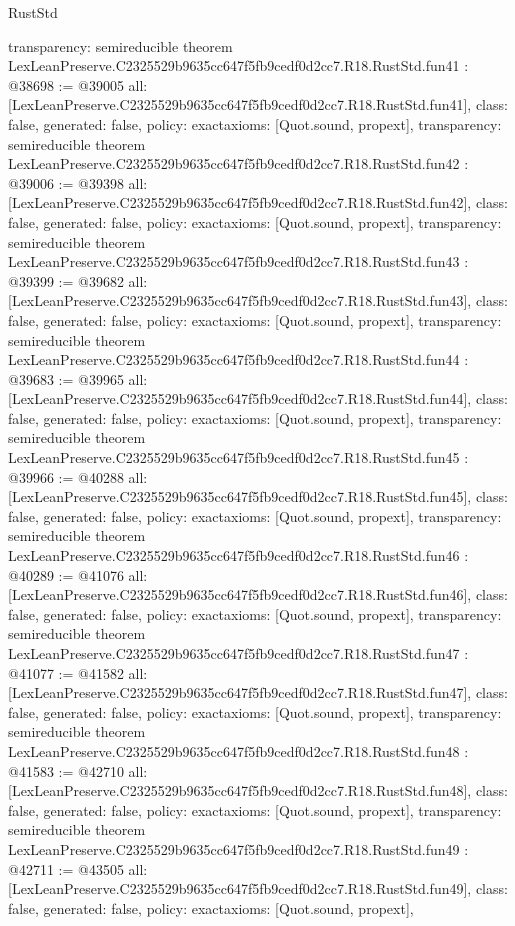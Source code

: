 \begin{lexlean}{RustStd}
\begin{coremodule}
{  transparency: semireducible
}
theorem LexLeanPreserve.C2325529b9635cc647f5fb9cedf0d2cc7.R18.RustStd.fun41 : @38698 := @39005 {
  all: [LexLeanPreserve.C2325529b9635cc647f5fb9cedf0d2cc7.R18.RustStd.fun41],
  class: false,
  generated: false,
  policy: exact{axioms: [Quot.sound, propext]},
  transparency: semireducible
}
theorem LexLeanPreserve.C2325529b9635cc647f5fb9cedf0d2cc7.R18.RustStd.fun42 : @39006 := @39398 {
  all: [LexLeanPreserve.C2325529b9635cc647f5fb9cedf0d2cc7.R18.RustStd.fun42],
  class: false,
  generated: false,
  policy: exact{axioms: [Quot.sound, propext]},
  transparency: semireducible
}
theorem LexLeanPreserve.C2325529b9635cc647f5fb9cedf0d2cc7.R18.RustStd.fun43 : @39399 := @39682 {
  all: [LexLeanPreserve.C2325529b9635cc647f5fb9cedf0d2cc7.R18.RustStd.fun43],
  class: false,
  generated: false,
  policy: exact{axioms: [Quot.sound, propext]},
  transparency: semireducible
}
theorem LexLeanPreserve.C2325529b9635cc647f5fb9cedf0d2cc7.R18.RustStd.fun44 : @39683 := @39965 {
  all: [LexLeanPreserve.C2325529b9635cc647f5fb9cedf0d2cc7.R18.RustStd.fun44],
  class: false,
  generated: false,
  policy: exact{axioms: [Quot.sound, propext]},
  transparency: semireducible
}
theorem LexLeanPreserve.C2325529b9635cc647f5fb9cedf0d2cc7.R18.RustStd.fun45 : @39966 := @40288 {
  all: [LexLeanPreserve.C2325529b9635cc647f5fb9cedf0d2cc7.R18.RustStd.fun45],
  class: false,
  generated: false,
  policy: exact{axioms: [Quot.sound, propext]},
  transparency: semireducible
}
theorem LexLeanPreserve.C2325529b9635cc647f5fb9cedf0d2cc7.R18.RustStd.fun46 : @40289 := @41076 {
  all: [LexLeanPreserve.C2325529b9635cc647f5fb9cedf0d2cc7.R18.RustStd.fun46],
  class: false,
  generated: false,
  policy: exact{axioms: [Quot.sound, propext]},
  transparency: semireducible
}
theorem LexLeanPreserve.C2325529b9635cc647f5fb9cedf0d2cc7.R18.RustStd.fun47 : @41077 := @41582 {
  all: [LexLeanPreserve.C2325529b9635cc647f5fb9cedf0d2cc7.R18.RustStd.fun47],
  class: false,
  generated: false,
  policy: exact{axioms: [Quot.sound, propext]},
  transparency: semireducible
}
theorem LexLeanPreserve.C2325529b9635cc647f5fb9cedf0d2cc7.R18.RustStd.fun48 : @41583 := @42710 {
  all: [LexLeanPreserve.C2325529b9635cc647f5fb9cedf0d2cc7.R18.RustStd.fun48],
  class: false,
  generated: false,
  policy: exact{axioms: [Quot.sound, propext]},
  transparency: semireducible
}
theorem LexLeanPreserve.C2325529b9635cc647f5fb9cedf0d2cc7.R18.RustStd.fun49 : @42711 := @43505 {
  all: [LexLeanPreserve.C2325529b9635cc647f5fb9cedf0d2cc7.R18.RustStd.fun49],
  class: false,
  generated: false,
  policy: exact{axioms: [Quot.sound, propext]},
}
\end{coremodule}
\end{lexlean}
